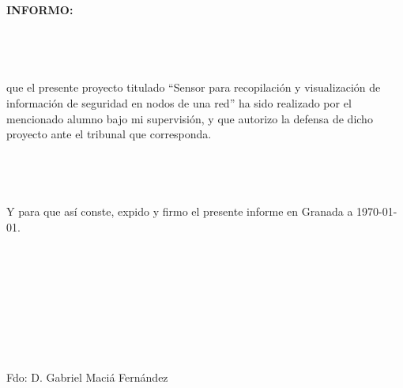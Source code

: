 \documentclass{article}
\begin{document}
\\
\\
\\
\\
\\
\\
\\
\\
\\
\quad \quad \textbf{INFORMO:}
\\
\\
\\
\\
\\
que el presente proyecto titulado ``Sensor para recopilación y visualización de información de seguridad en nodos de una red'' ha sido realizado por el mencionado alumno bajo mi supervisión, y que autorizo la defensa de dicho proyecto ante el tribunal que corresponda.\\
\\
\\
\\
\\
Y para que así conste, expido y firmo el presente informe en Granada a \today.
\\
\\
\\
\\
\\
\\
\\
\\
\\
\begin{center}Fdo: D. Gabriel Maciá Fernández \end{center}
\end{document}
